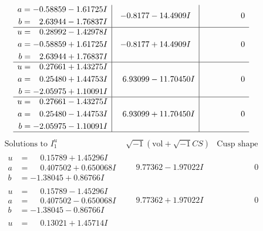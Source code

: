 \documentclass[1p]{elsarticle_modified}
\theoremstyle{definition}
\newcommand{\I}{\sqrt{-1}}
\begin{document}
$$\begin{array}{c|c|c}
\begin{aligned}
a &= -0.58859 - 1.61725 I \\
b &= \phantom{-}2.63944 - 1.76837 I\end{aligned}
 & -0.8177 - 14.4909 I & \phantom{-0.000000 } 0 \\ \hline\begin{aligned}
u &= \phantom{-}0.28992 - 1.42978 I \\
a &= -0.58859 + 1.61725 I \\
b &= \phantom{-}2.63944 + 1.76837 I\end{aligned}
 & -0.8177 + 14.4909 I & \phantom{-0.000000 } 0 \\ \hline\begin{aligned}
u &= \phantom{-}0.27661 + 1.43275 I \\
a &= \phantom{-}0.25480 + 1.44753 I \\
b &= -2.05975 + 1.10091 I\end{aligned}
 & \phantom{-}6.93099 - 11.70450 I & \phantom{-0.000000 } 0 \\ \hline\begin{aligned}
u &= \phantom{-}0.27661 - 1.43275 I \\
a &= \phantom{-}0.25480 - 1.44753 I \\
b &= -2.05975 - 1.10091 I\end{aligned}
 & \phantom{-}6.93099 + 11.70450 I & \phantom{-0.000000 } 0\\
 \hline 
 \end{array}$$\newpage$$\begin{array}{c|c|c}  
\text{Solutions to }I^u_{1}& \I (\text{vol} + \sqrt{-1}CS) & \text{Cusp shape}\\
 \hline 
\begin{aligned}
u &= \phantom{-}0.15789 + 1.45296 I \\
a &= \phantom{-}0.407502 + 0.650068 I \\
b &= -1.38045 + 0.86766 I\end{aligned}
 & \phantom{-}9.77362 - 1.97022 I & \phantom{-0.000000 } 0 \\ \hline\begin{aligned}
u &= \phantom{-}0.15789 - 1.45296 I \\
a &= \phantom{-}0.407502 - 0.650068 I \\
b &= -1.38045 - 0.86766 I\end{aligned}
 & \phantom{-}9.77362 + 1.97022 I & \phantom{-0.000000 } 0 \\ \hline\begin{aligned}
u &= \phantom{-}0.13021 + 1.45714 I \\

\end{aligned}
\end{array}$$
\end{document}
